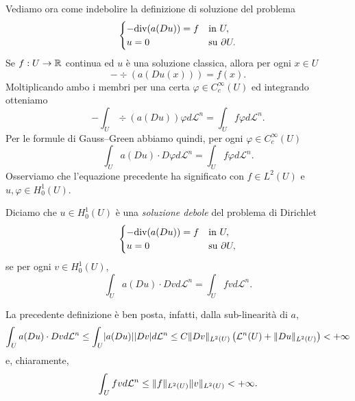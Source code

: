 Vediamo ora come indebolire la definizione di soluzione del problema 
\[ 	\begin{cases}
	-\div(a(Du)) = f & \textup{in } U,\\
	u = 0 & \textup{su } \partial U.
\end{cases} \]
Se $f: U \to \R$ continua ed $u$ è una soluzione classica, allora per ogni $x \in U$
\[ -\div(a(Du(x))) = f(x). \]
Moltiplicando ambo i membri per una certa $\varphi \in C^\infty_c(U)$ ed integrando otteniamo 
\[ -\int_U \div(a(Du)) \varphi d\mathcal{L}^n = \int_U f \varphi d\mathcal{L}^n. \]
Per le formule di Gauss--Green abbiamo quindi, per ogni $\varphi \in C^\infty_c(U)$
\[ \int_U a(Du) \cdot D\varphi d\mathcal{L}^n = \int_U f \varphi d\mathcal{L}^n. \]
Osserviamo che l'equazione precedente ha significato con $f \in L^2(U)$ e $u,\varphi \in H^1_0(U)$.
\begin{definizione}
	Diciamo che $u \in H^1_0(U)$ è una \emph{soluzione debole} del problema di Dirichlet
	\[ 	\begin{cases}
		-\div(a(Du)) = f & \textup{in } U,\\
		u = 0 & \textup{su } \partial U,
	\end{cases} \]
	se per ogni $v \in H^1_0(U)$, 
	\[ \int_U a(Du) \cdot Dv d\mathcal{L}^n = \int_U f v d\mathcal{L}^n. \]
\end{definizione}
\begin{osservazione}
	La precedente definizione è ben posta, infatti, dalla sub-linearità di $a$,
	\[ \int_U a(Du) \cdot Dv d\mathcal{L}^n \le \int_U \abs{a(Du)} \abs{Dv} d\mathcal{L}^n \le C \norm{Dv}_{L^2(U)}\left( \mathcal{L}^n(U)+\norm{Du}_{L^2(U)}\right)<+\infty  \]
	e, chiaramente,
	\[ \int_U f v d\mathcal{L}^n \le \norm{f}_{L^2(U)}\norm{v}_{L^2(U)} < +\infty.\]
\end{osservazione}

